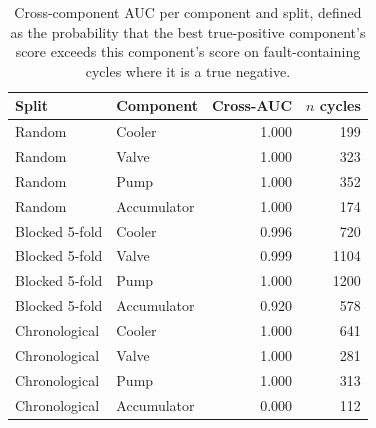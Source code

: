 \begin{table}[t]
\centering
\caption{Cross-component AUC per component and split, defined as the probability that the best true-positive component's score exceeds this component's score on fault-containing cycles where it is a true negative.}
\label{tab:crossauc}
\footnotesize
\begin{tabular}{llrr}
\hline
Split & Component & Cross-AUC & $n$ cycles \\
\hline
Random & Cooler & 1.000 & 199 \\
Random & Valve & 1.000 & 323 \\
Random & Pump & 1.000 & 352 \\
Random & Accumulator & 1.000 & 174 \\
\hline
Blocked 5-fold & Cooler & 0.996 & 720 \\
Blocked 5-fold & Valve & 0.999 & 1104 \\
Blocked 5-fold & Pump & 1.000 & 1200 \\
Blocked 5-fold & Accumulator & 0.920 & 578 \\
\hline
Chronological & Cooler & 1.000 & 641 \\
Chronological & Valve & 1.000 & 281 \\
Chronological & Pump & 1.000 & 313 \\
Chronological & Accumulator & 0.000 & 112 \\
\hline
\end{tabular}
\end{table}

